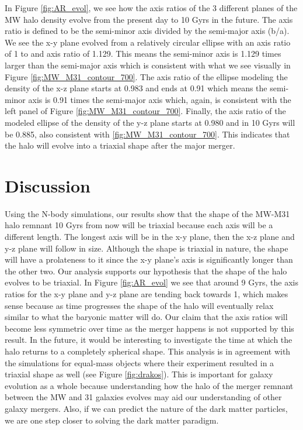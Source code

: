 \documentclass[linenumbers, twocolumn]{aastex631}
\begin{document}
In Figure \ref{fig:AR_evol}, we see how the axis ratios of the 3 different planes of the MW halo density evolve from the present day to 10 Gyrs in the future. The axis ratio is defined to be the semi-minor axis divided by the semi-major axis (b/a). We see the x-y plane evolved from a relatively circular ellipse with an axis ratio of 1 to and axis ratio of 1.129. This means the semi-minor axis is 1.129 times larger than the semi-major axis which is consistent with what we see visually in Figure \ref{fig:MW_M31_contour_700}. The axis ratio of the ellipse modeling the density of the x-z plane starts at 0.983 and ends at 0.91 which means the semi-minor axis is 0.91 times the semi-major axis which, again, is consistent with the left panel of Figure \ref{fig:MW_M31_contour_700}. Finally, the axis ratio of the modeled ellipse of the density of the y-z plane starts at 0.980 and in 10 Gyrs will be 0.885, also consistent with \ref{fig:MW_M31_contour_700}. This indicates that the halo will evolve into a triaxial shape after the major merger.

\section{Discussion}
Using the N-body simulations, our results show that the shape of the MW-M31 halo remnant 10 Gyrs from now will be triaxial because each axis will be a different length. The longest axis will be in the x-y plane, then the x-z plane and y-z plane will follow in size. Although the shape is triaxial in nature, the shape will have a prolateness to it since the x-y plane's axis is significantly longer than the other two.
Our analysis supports our hypothesis that the shape of the halo evolves to be triaxial. In Figure \ref{fig:AR_evol} we see that around 9 Gyrs, the axis ratios for the x-y plane and y-z plane are tending back towards 1, which makes sense because as time progresses the shape of the halo will eventually relax similar to what the baryonic matter will do. Our claim that the axis ratios will become less symmetric over time as the merger happens is not supported by this result. In the future, it would be interesting to investigate the time at which the halo returns to a completely spherical shape.
This analysis is in agreement with the \cite{2019drakos} simulations for equal-mass objects where their experiment resulted in a triaxial shape as well (see Figure \ref{fig:drakos}).
This is important for galaxy evolution as a whole because understanding how the halo of the merger remnant between the MW and 31 galaxies evolves may aid our understanding of other galaxy mergers. Also, if we can predict the nature of the dark matter particles, we are one step closer to solving the dark matter paradigm.
\end{document}
